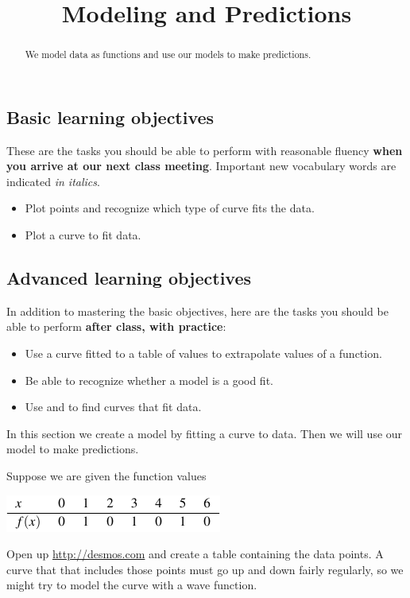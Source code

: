 \documentclass{ximera}
\title{Modeling and Predictions}
\begin{document}
\begin{abstract}
We model data as functions and use our models to make predictions.
\end{abstract}
\maketitle

\subsection*{Basic learning objectives}

These are the tasks you should be able to perform with reasonable fluency \textbf{when you arrive at our next class meeting}. Important new vocabulary words are indicated \emph{in italics}. 

\begin{itemize}
	\item Plot points and recognize which type of curve fits the data.
	\item Plot a curve to fit data.
\end{itemize}

\subsection*{Advanced learning objectives}

In addition to mastering the basic objectives, here are the tasks you should be able to perform \textbf{after class, with practice}: 

\begin{itemize}
	\item Use a curve fitted to a table of values to extrapolate values of a function.
    \item Be able to recognize whether a model is a good fit.
    \item Use  and  to find curves that fit data.
\end{itemize}

\noindent\hrulefill

In this section we create a model by fitting a curve to data. Then we will use our model to make predictions.

Suppose we are given the function values 
\begin{image}
\includegraphics{ModelingTable1.png}
\end{image}
Open up \href{http://desmos.com}{http://desmos.com} and create a table containing the data points. A curve that that includes those points must go up and down fairly regularly, so we might try to model the curve with a wave function.
\end{document}
